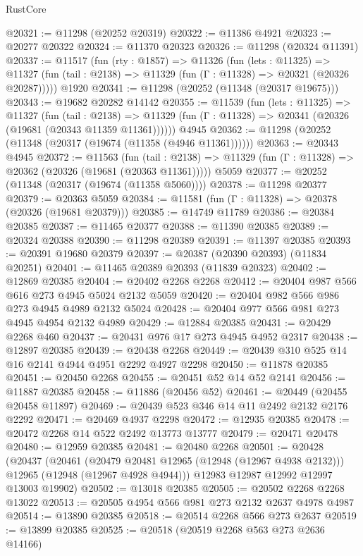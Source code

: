 \begin{lexlean}{RustCore}
\begin{coremodule}
@20321 := @11298 (@20252 @20319)
@20322 := @11386 @4921
@20323 := @20277 @20322
@20324 := @11370 @20323
@20326 := @11298 (@20324 @11391)
@20337 := @11517
    (fun (rty : @1857) =>
    @11326
      (fun (lets : @11325) =>
      @11327 (fun (tail : @2138) => @11329 (fun (Γ : @11328) => @20321 (@20326 @20287)))))
    @1920
@20341 := @11298 (@20252 (@11348 (@20317 @19675)))
@20343 := @19682 @20282 @14142
@20355 := @11539
    (fun (lets : @11325) =>
    @11327
      (fun (tail : @2138) =>
      @11329 (fun (Γ : @11328) => @20341 (@20326 (@19681 (@20343 @11359 @11361))))))
    @4945
@20362 := @11298 (@20252 (@11348 (@20317 (@19674 (@11358 (@4946 @11361))))))
@20363 := @20343 @4945
@20372 := @11563
    (fun (tail : @2138) => @11329 (fun (Γ : @11328) => @20362 (@20326 (@19681 (@20363 @11361)))))
    @5059
@20377 := @20252 (@11348 (@20317 (@19674 (@11358 @5060))))
@20378 := @11298 @20377
@20379 := @20363 @5059
@20384 := @11581 (fun (Γ : @11328) => @20378 (@20326 (@19681 @20379)))
@20385 := @14749 @11789
@20386 := @20384 @20385
@20387 := @11465 @20377
@20388 := @11390 @20385
@20389 := @20324 @20388
@20390 := @11298 @20389
@20391 := @11397 @20385
@20393 := @20391 @19680 @20379
@20397 := @20387 (@20390 @20393) (@11834 @20251)
@20401 := @11465 @20389 @20393 (@11839 @20323)
@20402 := @12869 @20385
@20404 := @20402 @2268 @2268
@20412 := @20404 @987 @566 @616 @273 @4945 @5024 @2132 @5059
@20420 := @20404 @982 @566 @986 @273 @4945 @4989 @2132 @5024
@20428 := @20404 @977 @566 @981 @273 @4945 @4954 @2132 @4989
@20429 := @12884 @20385
@20431 := @20429 @2268 @460
@20437 := @20431 @976 @17 @273 @4945 @4952 @2317
@20438 := @12897 @20385
@20439 := @20438 @2268
@20449 := @20439 @310 @525 @14 @16 @2141 @4944 @4951 @2292 @4927 @2298
@20450 := @11878 @20385
@20451 := @20450 @2268
@20455 := @20451 @52 @14 @52 @2141
@20456 := @11887 @20385
@20458 := @11886 (@20456 @52)
@20461 := @20449 (@20455 @20458 @11897)
@20469 := @20439 @523 @346 @14 @11 @2492 @2132 @2176 @2292
@20471 := @20469 @4937 @2298
@20472 := @12935 @20385
@20478 := @20472 @2268 @14 @522 @2492 @13773 @13777
@20479 := @20471 @20478
@20480 := @12959 @20385
@20481 := @20480 @2268
@20501 := @20428
    (@20437
      (@20461
        (@20479 @20481 @12965 (@12948 (@12967 @4938 @2132)))
        @12965
        (@12948 (@12967 @4928 @4944)))
      @12983
      @12987
      @12992
      @12997
      @13003
      @19902)
@20502 := @13018 @20385
@20505 := @20502 @2268 @2268 @13022
@20513 := @20505 @4954 @566 @981 @273 @2132 @2637 @4978 @4987
@20514 := @13890 @20385
@20518 := @20514 @2268 @566 @273 @2637
@20519 := @13899 @20385
@20525 := @20518 (@20519 @2268 @563 @273 @2636 @14166)

\end{coremodule}
\end{lexlean}
